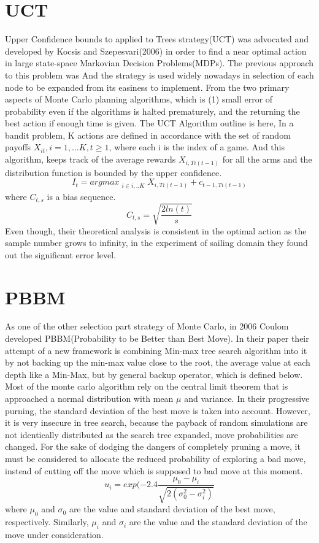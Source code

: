 \documentclass[11pt]{article}
\begin{document}
\section{UCT}
Upper Confidence bounds to applied to Trees strategy(UCT) was advocated and developed by Kocsis and Szepesvari(2006) in order to find a near optimal action in large state-space Markovian Decision Problems(MDPs)\cite{kocsis2006bandit}. The previous approach to this problem was 
And the strategy is used widely nowadays in selection of each node to be expanded from its easiness to implement.
From the two primary aspects of Monte Carlo planning algorithms, which is (1) small error of probability even if the algorithms is halted prematurely, and the returning the best action if enough time is given. The UCT Algorithm outline is here, In a bandit problem, K actions are defined in accordance with the set of random payoffs \(X_{it}, i = 1, ... K, t\geq 1\), where each i is the index of a game. And this algorithm, keeps track of the average rewards \(X_{i, Ti(t-1)}\) for all the arms and the distribution function is bounded by the upper confidence. 
\[ I_{t} = argmax_{\substack{i \in{i, .. K}}} {X_{i, Ti(t-1)} + c_{t-1, Ti(t-1)}}\]
where \(C_{t, s}\) is a bias sequence.
\[C_{t, s} = \sqrt{\frac{2ln(t)}{s}}\]
Even though, their theoretical analysis is consistent in the optimal action as the sample number grows to infinity, in the experiment of sailing domain they found out the significant error level. 
\section{PBBM}
As one of the other selection part strategy of Monte Carlo, in 2006 Coulom developed PBBM(Probability to be Better than Best Move)\cite{coulom2006efficient}. In their paper their attempt of a new framework is combining Min-max tree search algorithm into it by not backing up the min-max value close to the root, the average value at each depth like a Min-Max, but by general backup operator, which is defined below. 
Most of the monte carlo algorithm rely on the central limit theorem that is approached a normal distribution with mean \(\mu\) and variance. In their progressive purning, the standard deviation of the best move is taken into account. However, it is very insecure in tree search, because the payback of random simulations are not identically distributed as the search tree expanded, move probabilities are changed. For the sake of dodging the dangers of completely pruning a move, it must be considered to allocate the reduced probability of exploring a bad move, instead of cutting off the move which is supposed to bad move at this moment.   
\[u_{i} = exp(-2.4\frac{\mu_{0} - \mu_{i}}{\sqrt{2(\sigma^2_{0} - \sigma^2_{i})}}\]
where \(\mu_{0}\) and \(\sigma_{0}\) are the value and standard deviation of the best move, respectively. Similarly, \(\mu_{i}\) and \(\sigma_{i}\) are the value and the standard deviation of the move under consideration.
\end{document}
